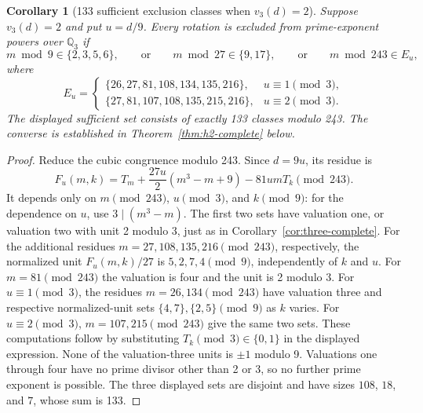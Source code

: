 \documentclass[10pt]{article}
\newtheorem{corollary}{Corollary}
\begin{document}
\begin{corollary}[133 sufficient exclusion classes when $v_3(d)=2$]
\label{cor:higher-133}
Suppose $v_3(d)=2$ and put $u=d/9$. Every rotation is excluded from
prime-exponent powers over $\mathbb Q_3$ if
\[
 m\bmod9\in\{2,3,5,6\},\qquad\text{or}\qquad
 m\bmod27\in\{9,17\},\qquad\text{or}\qquad m\bmod243\in E_u,
\]
where
\[
 E_u=\begin{cases}
 \{26,27,81,108,134,135,216\},&u\equiv1\pmod3,\\
 \{27,81,107,108,135,215,216\},&u\equiv2\pmod3.
 \end{cases}
\]
The displayed sufficient set consists of exactly 133 classes modulo
243. The converse is established in Theorem~\ref{thm:h2-complete} below.
\end{corollary}
\begin{proof}
Reduce the cubic congruence modulo 243. Since $d=9u$, its residue
is
\[
 F_u(m,k)=T_m+\frac{27u}{2}(m^3-m+9)-81umT_k\pmod{243}.
\]
It depends only on $m\pmod{243}$, $u\pmod3$, and $k\pmod9$:
for the dependence on $u$, use $3\mid(m^3-m)$.
The first two sets have valuation one, or valuation two with unit 2
modulo 3, just as in Corollary~\ref{cor:three-complete}.
For the additional residues $m=27,108,135,216\pmod{243}$,
respectively, the normalized unit $F_u(m,k)/27$ is
$5,2,7,4\pmod9$, independently of $k$ and $u$.
For $m=81\pmod{243}$ the valuation is four and the unit is 2 modulo 3.
For $u\equiv1\pmod3$, the residues $m=26,134\pmod{243}$ have
valuation three and respective normalized-unit sets
$\{4,7\},\{2,5\}\pmod9$ as $k$ varies.
For $u\equiv2\pmod3$, $m=107,215\pmod{243}$ give the same two
sets. These computations follow by substituting $T_k\pmod3\in\{0,1\}$
in the displayed expression. None of the valuation-three units is
$\pm1$ modulo 9. Valuations one through four have no prime divisor
other than 2 or 3, so no further prime exponent is possible.
The three displayed sets are disjoint and have sizes $108$, $18$,
and $7$, whose sum is 133.
\end{proof}
\end{document}
